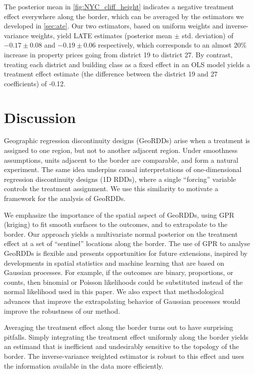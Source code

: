 \documentclass{article}
\begin{document}
The posterior mean in \autoref{fig:NYC_cliff_height} indicates a negative treatment effect everywhere along the border, which can be averaged by the estimators we developed in \autoref{sec:ate}.
Our two estimators, based on uniform weights and inverse-variance weights, yield LATE estimates (posterior mean \(\pm\) std. deviation) of \(-0.17\pm 0.08\) and \(-0.19 \pm 0.06\) respectively, which corresponds to an almost 20\% increase in property prices going from district 19 to district 27.
By contrast, treating each district and building class as a fixed effect in an OLS model yields a treatment effect estimate (the difference between the district 19 and 27 coefficients) of -0.12. 

\section{Discussion}

Geographic regression discontinuity designs (GeoRDDs) arise when a treatment is assigned to one region, but not to another adjacent region.
Under smoothness assumptions, units adjacent to the border are comparable, and form a natural experiment.
The same idea underpins causal interpretations of one-dimensional regression discontinuity designs (1D RDDs), where a single ``forcing'' variable controls the treatment assignment.
We use this similarity to motivate a framework for the analysis of GeoRDDs.

We emphasize the importance of the spatial aspect of GeoRDDs, 
using GPR (kriging) to fit smooth surfaces to the outcomes, and to extrapolate to the border.
Our approach yields a multivariate normal posterior on the treatment effect at a set of ``sentinel'' locations along the border.
The use of GPR to analyse GeoRDDs is flexible and presents opportunities for future extensions, 
inspired by developments in spatial statistics and machine learning that are based on Gaussian processes.
For example, if the outcomes are binary, proportions, or counts, then binomial or Poisson likelihoods could be substituted instead of the normal likelihood used in this paper.
We also expect that methodological advances that improve the extrapolating behavior of Gaussian processes \citep[e.g.][]{wilson2013gaussian} would improve the robustness of our method.

Averaging the treatment effect along the border turns out to have surprising pitfalls.
Simply integrating the treatment effect uniformly along the border yields an estimand that is inefficient and undesirably sensitive to the topology of the border.
The inverse-variance weighted estimator is robust to this effect and uses the information available in the data more efficiently.
\end{document}
